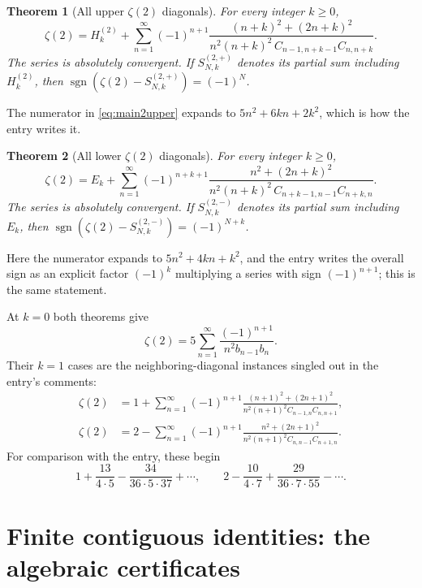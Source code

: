 \documentclass[11pt,letterpaper]{article}
\numberwithin{equation}{section}
\newtheorem{theorem}{Theorem}[section]
\theoremstyle{definition}
\newcommand{\Hh}[2]{H_{#1}^{(#2)}}
\newcommand{\ztwo}{\zeta(2)}
\DeclareMathOperator{\sgn}{sgn}
\begin{document}
\begin{theorem}[All upper $\zeta(2)$ diagonals]\label{thm:zeta2upper}
For every integer $k\geq0$,
\begin{equation}\label{eq:main2upper}
 \boxed{\displaystyle
 \ztwo=\Hh{k}{2}+
 \sum_{n=1}^{\infty}(-1)^{n+1}
 \frac{(n+k)^2+(2n+k)^2}
 {n^2(n+k)^2\,C_{n-1,n+k-1}C_{n,n+k}}.}
\end{equation}
The series is absolutely convergent. If $S^{(2,+)}_{N,k}$ denotes its
partial sum including $\Hh{k}{2}$, then
$\sgn(\ztwo-S^{(2,+)}_{N,k})=(-1)^N$.
\end{theorem}

The numerator in \eqref{eq:main2upper} expands to $5n^2+6kn+2k^2$, which
is how the entry writes it.

\begin{theorem}[All lower $\zeta(2)$ diagonals]\label{thm:zeta2lower}
For every integer $k\geq0$,
\begin{equation}\label{eq:main2lower}
 \boxed{\displaystyle
 \ztwo=E_k+
 \sum_{n=1}^{\infty}(-1)^{n+k+1}
 \frac{n^2+(2n+k)^2}
 {n^2(n+k)^2\,C_{n+k-1,n-1}C_{n+k,n}}.}
\end{equation}
The series is absolutely convergent. If $S^{(2,-)}_{N,k}$ denotes its
partial sum including $E_k$, then
$\sgn(\ztwo-S^{(2,-)}_{N,k})=(-1)^{N+k}$.
\end{theorem}

Here the numerator expands to $5n^2+4kn+k^2$, and the entry writes the
overall sign as an explicit factor $(-1)^k$ multiplying a series with
sign $(-1)^{n+1}$; this is the same statement.

At $k=0$ both theorems give
\begin{equation}\label{eq:classical2}
 \ztwo=5\sum_{n=1}^{\infty}\frac{(-1)^{n+1}}{n^2 b_{n-1}b_n}.
\end{equation}
Their $k=1$ cases are the neighboring-diagonal instances singled out in
the entry's comments:
\begin{align}
 \ztwo&=1+\sum_{n=1}^{\infty}(-1)^{n+1}
 \frac{(n+1)^2+(2n+1)^2}
 {n^2(n+1)^2 C_{n-1,n}C_{n,n+1}},\label{eq:oeis2upper}\\
 \ztwo&=2-\sum_{n=1}^{\infty}(-1)^{n+1}
 \frac{n^2+(2n+1)^2}
 {n^2(n+1)^2 C_{n,n-1}C_{n+1,n}}.\label{eq:oeis2lower}
\end{align}
For comparison with the entry, these begin
\[
 1+\frac{13}{4\cdot5}-\frac{34}{36\cdot5\cdot37}+\cdots,
 \qquad
 2-\frac{10}{4\cdot7}+\frac{29}{36\cdot7\cdot55}-\cdots.
\]

\section{Finite contiguous identities: the algebraic certificates}\label{sec:contiguous}
\end{document}
